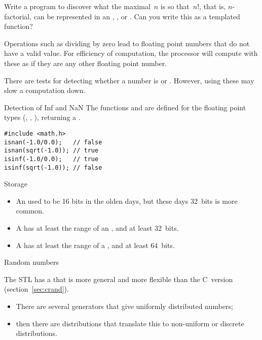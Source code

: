 \begin{exercise}
  \label{ex:big-factorial}
  Write a program to discover what the maximal~$n$ is so that~$n!$,
  that is, $n$-factorial, can be represented in an , ,
  or . Can you write this as a templated function?
\end{exercise}

Operations such as dividing by zero lead to floating point numbers
that do not have a valid value. For efficiency of computation, the
processor will compute with these as if they are any other floating
point number.

There are tests for detecting whether a number is  or
. However, using these may slow a computation down.

\begin{block}{Detection of Inf and NaN}
  The functions  and  are
  defined for the floating point types (, , ), returning a .
\begin{lstlisting}
#include <math.h>
isnan(-1.0/0.0);   // false
isnan(sqrt(-1.0)); // true
isinf(-1.0/0.0);   // true
isinf(sqrt(-1.0)); // false
\end{lstlisting}
\end{block}

 {Storage}

\begin{itemize}
\item An  used to be 16 bits in the olden days, but these days
  32~bits is more common.
\item A  has at least the range of an
  , and at least 32~bits.
\item A  has at least the
  range of a , and at least 64~bits.
\end{itemize}

 {Random numbers}
\label{sec:stl:random}

The \ac{STL} has a
that is more general and more flexible than the C~version (section~\ref{sec:crand}).
\begin{itemize}
\item There are several generators that give uniformly distributed
  numbers;
\item then there are distributions that translate this to non-uniform
  or discrete distributions.
\end{itemize}


